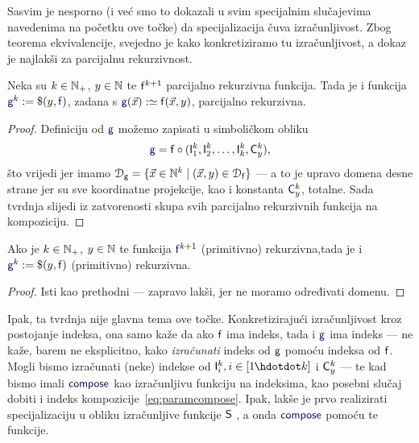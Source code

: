 Sasvim je nesporno (i već smo to dokazali u svim specijalnim slučajevima navedenima na početku ove točke) da specijalizacija čuva izračunljivost. Zbog teorema ekvivalencije, svejedno je kako konkretiziramo tu izračunljivost, a dokaz je najlakši za parcijalnu rekurzivnost.

\begin{propozicija}[{name=[specijalizacija čuva parcijalnu rekurzivnost]}]
    Neka su $k\in{\mathbb N}_+$, $y\in{\mathbb N}$ te $\f f^{k+1}$ parcijalno rekurzivna funkcija.\newline
    Tada je i funkcija $\f g^k:=\$(y,\f f)$, zadana s
    $\f g(\vec x):\simeq\f f(\vec x,y)$,
parcijalno rekurzivna.
\end{propozicija}
\begin{proof}
Definiciju od $\f g$ možemo zapisati u simboličkom obliku
\begin{equation}\label{eq:paramcompose}
    \f g=\f f\circ(\f I_1^k,\f I_2^k,\dotsc,\f I_k^k,\f C_y^k)\text,
\end{equation}
što vrijedi jer imamo $\dom{\f g}=\{\vec x\in\N^k\mid(\vec x,y)\in\dom{\f f}\}$ --- a to je upravo domena desne strane jer su sve koordinatne projekcije, kao i konstanta $\f C_y^k$, totalne. Sada tvrdnja slijedi iz zatvorenosti skupa svih parcijalno rekurzivnih funkcija na kompoziciju.
\end{proof}

\begin{korolar}[{name=[specijalizacija čuva (primitivnu) rekurzivnost]}]\label{kor:paramprn}
    Ako je $k\in{\mathbb N}_+$, $y\in{\mathbb N}$ te funkcija $\f f^{k+1}$ (primitivno) rekurzivna,\newline tada je i $\f g^k:=\$(y,\f f)$ (primitivno) rekurzivna.
\end{korolar}
\begin{proof}
Isti kao prethodni --- zapravo lakši, jer ne moramo određivati domenu.
\end{proof}

Ipak, ta tvrdnja nije glavna tema ove točke. Konkretizirajući izračunljivost kroz postojanje indeksa, ona samo kaže da ako $\f f$ ima indeks, tada i $\f g$ ima indeks --- ne kaže, barem ne eksplicitno, kako \emph{izračunati} indeks od $\f g$ pomoću indeksa od $\f f$. Mogli bismo izračunati (neke) indekse od $\f I_i^k,i\in[1\mspace{-1mu}\dd k]$ i $\f C_y^k$ --- te kad bismo imali $\f{compose}$ kao izračunljivu funkciju na indeksima, kao posebni slučaj dobiti i indeks kompozicije~\eqref{eq:paramcompose}. Ipak, lakše je prvo realizirati specijalizaciju u obliku izračunljive funkcije $\f S$%
, a onda $\f{compose}$ pomoću te funkcije.

